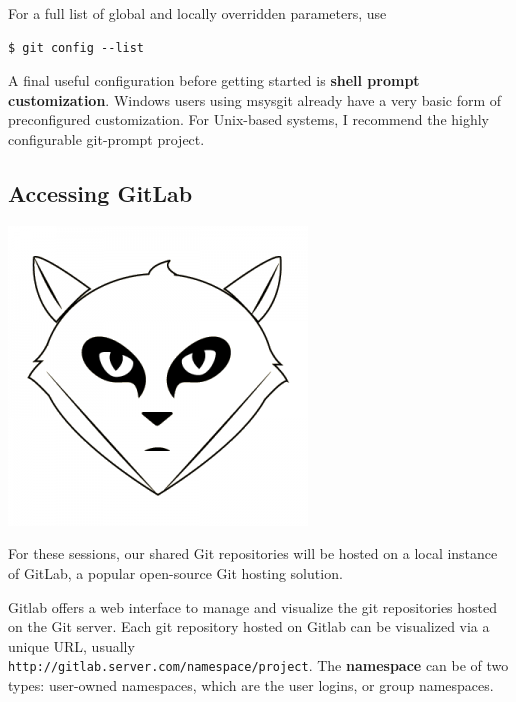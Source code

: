 \documentclass{../common/tufte-latex/tufte-handout}
\begin{document}
\noindent For a full list of global and locally overridden parameters, use

\begin{lstlisting}[style=BashInputStyle]
  $ git config --list
\end{lstlisting}

A final useful configuration before getting started is \textbf{shell prompt customization}.
Windows users using msysgit already have a very basic form of preconfigured customization. 
For Unix-based systems, I recommend the highly configurable git-prompt project. 


\subsection{Accessing GitLab}

\begin{marginfigure}%
  \centering
  \includegraphics[width=0.6\linewidth]{gitlab-logo.png}
  \label{fig:gitlablogo}
\end{marginfigure}
For these sessions, our shared Git repositories will be hosted on a local instance of GitLab, a popular open-source Git hosting solution.

Gitlab offers a web interface to manage and visualize the git repositories hosted on the Git server.
Each git repository hosted on Gitlab can be visualized via a unique URL, usually \\ \noindent \texttt{http://gitlab.server.com/namespace/project}.
The \textbf{namespace} can be of two types: user-owned namespaces, which are the user logins, or group namespaces.
\end{document}
